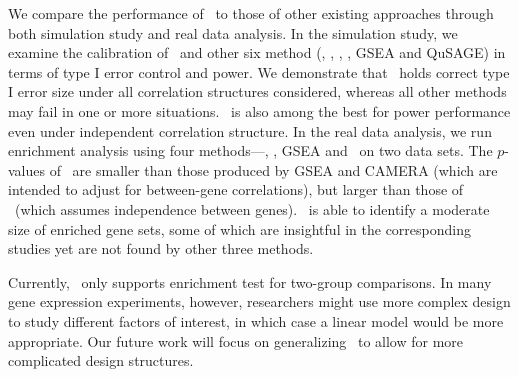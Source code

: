 	We compare the performance of \OurMethod~to those of other existing approaches through both 
	simulation study and real data analysis. In the simulation study, we examine the calibration 
	of \OurMethod~and other six method (\gent, \genr, \CMT, \CMR, GSEA and QuSAGE) in terms of type 
	I error control and power. We demonstrate that \OurMethod~holds correct type I error size under 
	all correlation structures considered, whereas all other methods may fail in one or more 
	situations. \OurMethod~is also among the best for power performance even under independent 
	correlation structure. In the real data analysis, we run enrichment analysis using four 
	 methods---\OurMethod, \CMT, GSEA and \genr~on two data sets.
	The $p$-values of \OurMethod~are smaller than those produced by 
	 GSEA and CAMERA (which are intended to adjust for between-gene correlations), but 
	 larger than those of \genr~(which assumes independence between genes).
	 \OurMethod~is able to identify a moderate size of enriched gene  sets, some of which are 
	 insightful in the corresponding studies yet are not found by other three methods.
	
	Currently, \OurMethod~only supports enrichment test for two-group comparisons. In
	many gene expression experiments, however, researchers might use more complex design to study
	different factors of interest, in which case a linear model would be more appropriate. Our
	future work will focus on generalizing \OurMethod~to allow for more complicated design 
	structures. 
	
